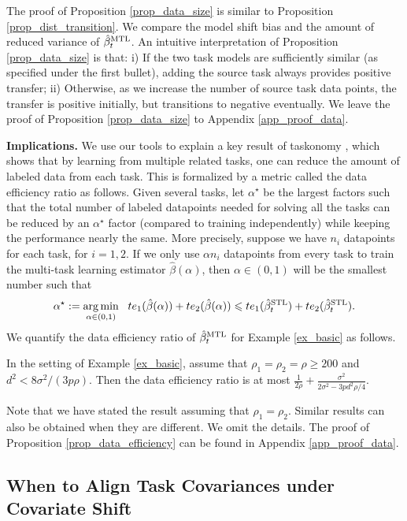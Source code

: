 The proof of Proposition \ref{prop_data_size} is similar to Proposition \ref{prop_dist_transition}.
We compare the model shift bias and the amount of reduced variance of $\hat{\beta}_t^{\text{MTL}}$.
An intuitive interpretation of Proposition \ref{prop_data_size} is that:
i) If the two task models are sufficiently similar (as specified under the first bullet), adding the source task always provides positive transfer;
ii) Otherwise, as we increase the number of source task data points, the transfer is positive initially, but transitions to negative eventually.
We leave the proof of Proposition \ref{prop_data_size} to Appendix \ref{app_proof_data}.

\textbf{Implications.} We use our tools to explain a key result of taskonomy \cite{ZSSGM18}, which shows that by learning from multiple related tasks, one can reduce the amount of labeled data from each task.
This is formalized by a metric called the data efficiency ratio as follows.
Given several tasks, let $\alpha^{\star}$ be the largest factors such that the total number of labeled datapoints needed for solving all the tasks can be reduced by an $\alpha^{\star}$ factor (compared to training independently) while keeping the performance nearly the same.
More precisely, suppose we have $n_i$ datapoints for each task, for $i= 1, 2$.
If we only use $\alpha n_i$ datapoints from every task to train the multi-task learning estimator $\hat{\beta}(\alpha)$, then $\alpha \in (0, 1)$ will be the smallest number such that
\[ \alpha^{\star} :=\operatorname*{arg\,min}_{\alpha\in(0, 1)} ~~ te_1(\hat{\beta}(\alpha)) + te_2(\hat{\beta}(\alpha))\leqslant te_1(\hat{\beta}_t^{\text{STL}}) + te_2(\hat{\beta}_t^{\text{STL}}). \]
We quantify the data efficiency ratio of $\hat{\beta}_t^{\text{MTL}}$ for Example \ref{ex_basic} as follows.

\begin{proposition}\label{prop_data_efficiency}
	In the setting of Example \ref{ex_basic}, assume that $\rho_1 = \rho_2 = \rho \ge 200$ and $d^2 < {8\sigma^2} /{(3p \rho)}$.
	Then the data efficiency ratio is at most $\frac{1}{2\rho} + \frac{\sigma^2}{2\sigma^2 - 3p d^2 \rho / 4}$.
\end{proposition}
Note that we have stated the result assuming that $\rho_1 = \rho_2$.
Similar results can also be obtained when they are different.
We omit the details.
The proof of Proposition \ref{prop_data_efficiency} can be found in Appendix \ref{app_proof_data}.




\subsection{When to Align Task Covariances under Covariate Shift}\label{sec_covariate}

